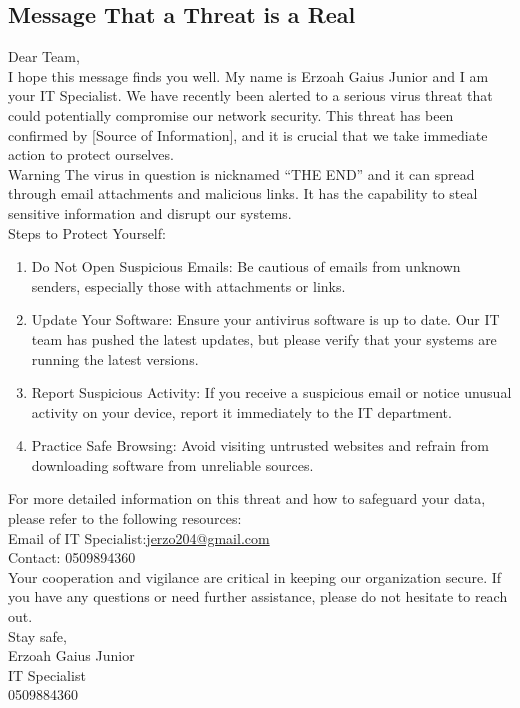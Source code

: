 \subsection*{Message That a Threat is a Real}
Dear Team, \\

I hope this message finds you well. My name is Erzoah Gaius Junior and I am your IT Specialist. We have recently been alerted to a serious virus threat that could potentially compromise our network security. This threat has been confirmed by [Source of Information], and it is crucial that we take immediate action to protect ourselves. \\
Warning
The virus in question is nicknamed “THE END” and it can spread through email attachments and malicious links. It has the capability to steal sensitive information and disrupt our systems.\\
Steps to Protect Yourself:\\
\begin{enumerate}
	\item
	Do Not Open Suspicious Emails: Be cautious of emails from unknown senders, especially those with attachments or links.
	\item
	 Update Your Software: Ensure your antivirus software is up to date. Our IT team has pushed the latest updates, but please verify that your systems are running the latest versions.
	 \item
	 Report Suspicious Activity: If you receive a suspicious email or notice unusual activity on your device, report it immediately to the IT department.
	 \item
	 Practice Safe Browsing: Avoid visiting untrusted websites and refrain from downloading software from unreliable sources.
\end{enumerate}
For more detailed information on this threat and how to safeguard your data, please refer to the following resources:\\
Email of IT Specialist:\url{jerzo204@gmail.com}\\
Contact: 0509894360
\\Your cooperation and vigilance are critical in keeping our organization secure. If you have any questions or need further assistance, please do not hesitate to reach out.
\\
Stay safe, \\
Erzoah Gaius Junior\\
IT Specialist\\
0509884360
